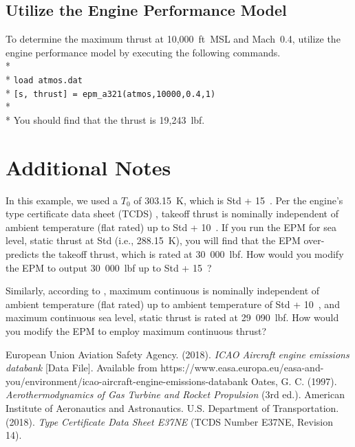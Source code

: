 \documentclass[12pt,twoside]{article}
\begin{document}
\subsection{Utilize the Engine Performance Model}
To determine the maximum thrust at 10,000~ft~MSL and Mach~0.4, utilize the engine performance model by executing the following commands. \\*
\\*
\texttt{load atmos.dat}\\*
\texttt{[s, thrust] = epm\_a321(atmos,10000,0.4,1)}\\*
\\*
You should find that the thrust is 19,243~lbf.

\section{Additional Notes}
In this example, we used a $T_0$ of 303.15~K, which is Std + 15~\textcelsius{}.  Per the engine's type certificate data sheet (TCDS) \cite{tcds}, takeoff thrust is nominally independent of ambient temperature (flat rated) up to Std + 10~\textcelsius{}.  If you run the EPM for sea level, static thrust at Std (i.e., 288.15~K), you will find that the EPM over-predicts the takeoff thrust, which is rated at 30~000~lbf.  How would you modify the EPM to output 30~000~lbf up to Std + 15~\textcelsius{}?

Similarly, according to \cite{tcds}, maximum continuous is nominally independent of ambient temperature (flat rated) up to ambient temperature of Std + 10~\textcelsius{}, and maximum continuous sea level, static thrust is rated at 29~090~lbf.  How would you modify the EPM to employ maximum continuous thrust?

\begin{thebibliography}{99}
 European Union Aviation Safety Agency. (2018). \emph{ICAO Aircraft engine emissions databank} [Data File]. Available from https://www.easa.europa.eu/easa-and-you/environment/icao-aircraft-engine-emissions-databank
 Oates, G. C. (1997). \emph{Aerothermodynamics of Gas Turbine and Rocket Propulsion} (3rd ed.). American Institute of Aeronautics and Astronautics.
 U.S. Department of Transportation. (2018). \emph{Type Certificate Data Sheet E37NE} (TCDS Number E37NE, Revision 14).
\end{thebibliography}
\end{document}

